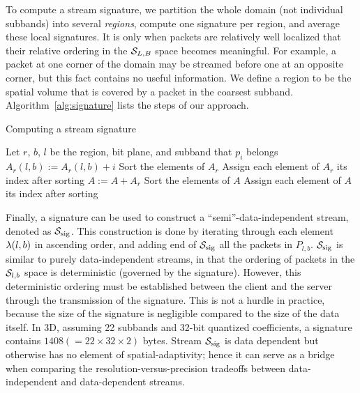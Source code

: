 To compute a stream signature, we partition the whole domain (not individual subbands) into several
\emph{regions}, compute one signature per region, and average these local signatures. It is only
when packets are relatively well localized that their relative ordering in the $\strm_{L,B}$ space
becomes meaningful. For example, a packet at one corner of the domain may be streamed before one at
an opposite corner, but this fact contains no useful information. We define a region to be the
spatial volume that is covered by a packet in the coarsest subband. Algorithm~\ref{alg:signature}
lists the steps of our approach.

\begin{algorithm}[h]
  \caption{Computing a stream signature}
  \begin{algorithmic}[1]
			\State Let $r$, $b$, $l$ be the region, bit plane, and subband that $p_i$ belongs
			\State $A_r(l,b) := A_r(l,b)+i$
		\EndFor
			\State Sort the elements of $A_r$
			\State Assign each element of $A_r$ its index after sorting
			\State $A := A+A_r$
		\EndFor
		\State Sort the elements of $A$
		\State Assign each element of $A$ its index after sorting
	\end{algorithmic}
	\label{alg:signature}
\end{algorithm}

Finally, a signature can be used to construct a ``semi''-data-independent stream, denoted as
$\ssig$. This construction is done by iterating through each element $\sgn(l,b)$ in ascending order,
and adding end of $\ssig$ all the packets in $P_{l,b}$. $\ssig$ is similar to purely
data-independent streams, in that the ordering of packets in the $\strm_{l,b}$ space is
deterministic (governed by the signature). However, this deterministic ordering must be established
between the client and the server through the transmission of the signature. This is not a hurdle in
practice, because the size of the signature is negligible compared to the size of the data itself.
In 3D, assuming 22 subbands and 32-bit quantized coefficients, a signature contains $1408 (=22\times
32\times 2)$ bytes. Stream $\ssig$ is data dependent but otherwise has no element of
spatial-adaptivity; hence it can serve as a bridge when comparing the resolution-versus-precision
tradeoffs between data-independent and data-dependent streams.

